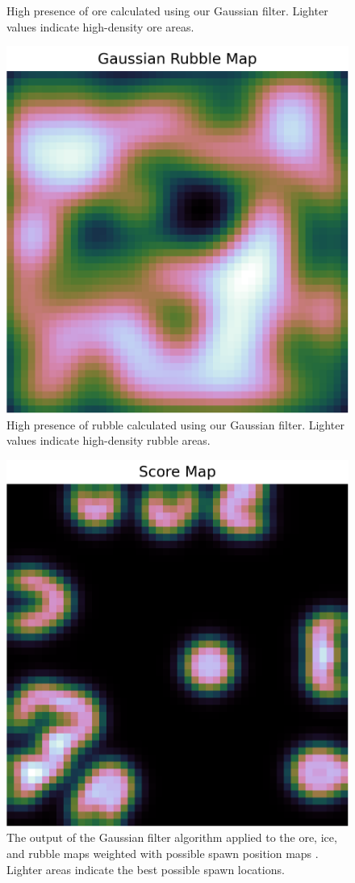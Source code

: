 \begin{figure}[htbp]
\begin{minipage}{0.3\textwidth}
        \captionsetup{justification=justified, singlelinecheck=false, width=1\linewidth, labelfont=bf} 
        \caption{High presence of ore calculated using our Gaussian filter. Lighter values indicate high-density ore areas.}
        \label{fig:gaussian-ore}
    \end{minipage}\hfill
    \begin{minipage}{0.3\textwidth}
        \centering
        \includegraphics[width=\linewidth]{images/methods_mono/factory_placement/gaussian_rubble_map.png}
        \captionsetup{justification=justified, singlelinecheck=false, width=1\linewidth, labelfont=bf} 
        \caption{High presence of rubble calculated using our Gaussian filter. Lighter values indicate high-density rubble areas.}
        \label{fig:gaussian-rubble}
    \end{minipage}
\end{figure}


\begin{figure}[htbp]
    \centering
    \includegraphics[width=0.3\linewidth]{images/methods_mono/factory_placement/score_map.png}
    \captionsetup{justification=justified, singlelinecheck=false, width=1\linewidth, labelfont=bf} 
    \caption[]{The output of the Gaussian filter algorithm applied to the ore, ice, and rubble maps weighted with possible spawn position maps \protect\footnotemark. Lighter areas indicate the best possible spawn locations.}
    \label{fig:score-map}
\end{figure}

